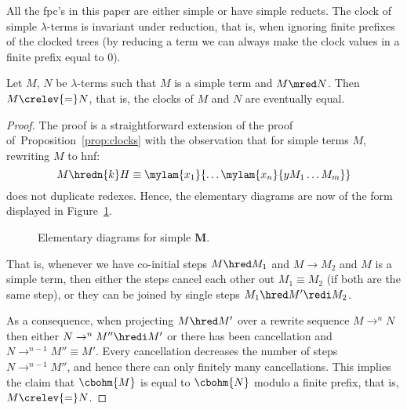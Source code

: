 All the fpc's in this paper are either simple or have simple reducts.
The clock of simple $\lambda$-terms is invariant under reduction,
that is, when ignoring finite prefixes of the clocked \bohm{} trees
(by reducing a term we can always make the clock values
in a finite prefix equal to $0$).
\begin{proposition}\label{prop:simple}
  Let $M$, $N$ be $\lambda$-terms such that $M$ is a simple term and $M \mred N$.
  Then $M \crelev{=} N$, that is, the clocks of $M$ and $N$ are eventually equal.
\end{proposition}
\begin{proof}
  The proof is a straightforward extension of the proof of~Proposition~\ref{prop:clocks}
  with the observation that for simple terms $M$,
  rewriting $M$ to hnf:
  \[M \hredn{k} H \equiv \mylam{x_1}{\ldots\mylam{x_n}{y M_1 \ldots M_m}}\] 
  does not duplicate redexes.
  Hence, the elementary diagrams
  are now of the form displayed in Figure~\ref{fig:elementary:diagram:simple}.
  \begin{figure}[ht!]
  \begin{center}
  \vspace{-2ex}
  \caption{Elementary diagrams for simple $\boldsymbol{M}$.}
  \vspace{-2ex}
  \label{fig:elementary:diagram:simple}
  \end{center}
  \end{figure}
  
  That is, whenever we have co-initial steps $M \hred M_1$ and $M \to M_2$
  and $M$ is a simple term,
  then either the steps cancel each other out $M_1 \equiv M_2$ (if both are the same step),
  or they can be joined by single steps $M_1 \hred M' \redi M_2$.

  As a consequence, when projecting $M \hred M'$ over a rewrite sequence $M \to^n N$
  then either $N \to^n M'' \hredi M'$ or
  there has been cancellation and $N \to^{n-1} M'' \equiv M'$.
  Every cancellation decreases the number of steps $N \to^{n-1} M''$,
  and hence there can only finitely many cancellations.
  This implies the claim that $\cbohm{M}$ is equal to $\cbohm{N}$
  modulo a finite prefix, that is, $M \crelev{=} N$.
\end{proof}

